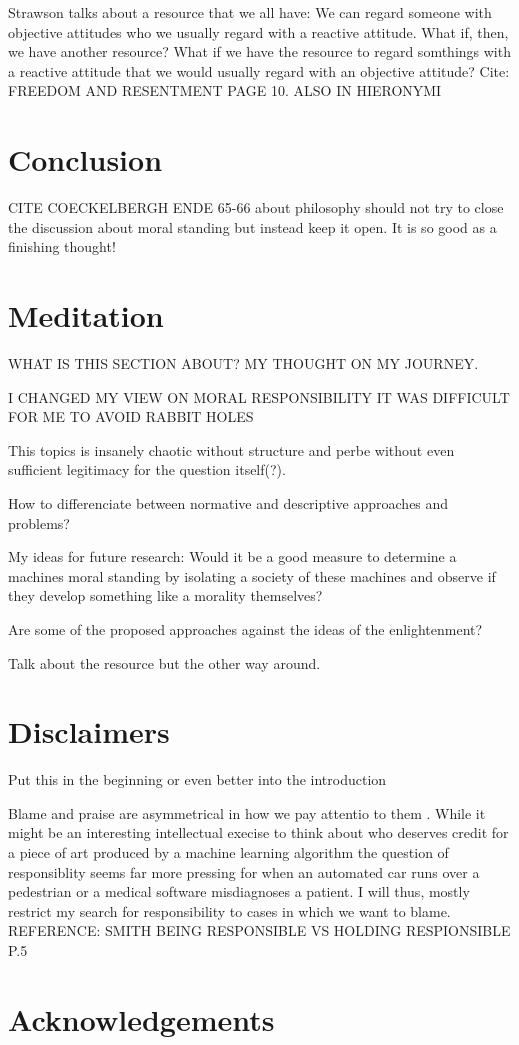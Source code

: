 \documentclass{article}
\begin{document}
Strawson talks about a resource that we all have: We can regard someone with
objective attitudes who we usually regard with a reactive attitude. What if,
then, we have another resource? What if we have the resource to regard somthings
with a reactive attitude that we would usually regard with an objective
attitude? Cite: FREEDOM AND RESENTMENT PAGE 10. ALSO IN HIERONYMI
\section{Conclusion}

CITE COECKELBERGH ENDE 65-66 about philosophy should not try to close the
discussion about moral standing but instead keep it open. It is so good as a
finishing thought!
\section{Meditation}
WHAT IS THIS SECTION ABOUT?
MY THOUGHT ON MY JOURNEY.

I CHANGED MY VIEW ON MORAL RESPONSIBILITY
IT WAS DIFFICULT FOR ME TO AVOID RABBIT HOLES

This topics is insanely chaotic without structure and perbe without even
sufficient legitimacy for the question itself(?).

How to differenciate between normative and descriptive approaches and problems?

My ideas for future research: Would it be a good measure to determine a machines
moral standing by isolating a society of these machines and observe if they
develop something like a morality themselves?

Are some of the proposed approaches against the ideas of the enlightenment?

Talk about the resource but the other way around.
\section{Disclaimers}
Put this in the beginning or even better into the introduction

Blame and praise are asymmetrical in how we pay attentio to them . While it
might be an interesting intellectual execise to think about who deserves credit
for a piece of art produced by a machine learning algorithm the question of
responsiblity seems far more pressing for when an automated car runs over a
pedestrian or a medical software misdiagnoses a patient. I will thus, mostly
restrict my search for responsibility to cases in which we want to blame.
REFERENCE: SMITH BEING RESPONSIBLE VS HOLDING RESPIONSIBLE P.5
\section{Acknowledgements}
\clearpage

\printglossary[type=\acronymtype]
\printglossary
\printbibliography
\end{document}
